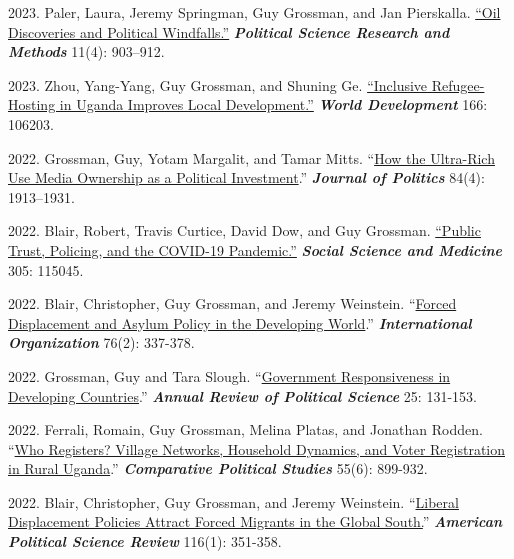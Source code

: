 \documentclass[10pt,a4paper]{article}
\begin{document}
\begin{etaremune}[leftmargin=2.5em, itemsep=8pt, topsep=4pt]
\item \textcolor{secondary}{2023.} Paler, Laura, Jeremy Springman, Guy Grossman, and Jan Pierskalla. \href{https://doi.org/10.1017/psrm.2023.14}{``Oil Discoveries and Political Windfalls.''} \textbf{\textit{Political Science Research and Methods}} 11(4): 903--912.

\item \textcolor{secondary}{2023.} Zhou, Yang-Yang, Guy Grossman, and Shuning Ge. \href{https://authors.elsevier.com/sd/article/S0305750X23000219}{``Inclusive Refugee-Hosting in Uganda Improves Local Development.''} \textbf{\textit{World Development}} 166: 106203.

\item \textcolor{secondary}{2022.} Grossman, Guy, Yotam Margalit, and Tamar Mitts. ``\href{https://bit.ly/3DIZeQA}{How the Ultra-Rich Use Media Ownership as a Political Investment}.'' \textbf{\textit{Journal of Politics}} 84(4): 1913--1931.

\item \textcolor{secondary}{2022.} Blair, Robert, Travis Curtice, David Dow, and Guy Grossman. \href{https://doi.org/10.1016/j.socscimed.2022.115045}{``Public Trust, Policing, and the COVID-19 Pandemic.''} \textbf{\textit{Social Science and Medicine}} 305: 115045.

\item \textcolor{secondary}{2022.} Blair, Christopher, Guy Grossman, and Jeremy Weinstein. ``\href{https://bit.ly/2ZfRc1z}{Forced Displacement and Asylum Policy in the Developing World}.'' \textbf{\textit{International Organization}} 76(2): 337-378.

\item \textcolor{secondary}{2022.} Grossman, Guy and Tara Slough. ``\href{https://www.annualreviews.org/doi/abs/10.1146/annurev-polisci-051120-112501}{Government Responsiveness in Developing Countries}.'' \textbf{\textit{Annual Review of Political Science}} 25: 131-153.

\item \textcolor{secondary}{2022.} Ferrali, Romain, Guy Grossman, Melina Platas, and Jonathan Rodden. ``\href{https://journals.sagepub.com/doi/full/10.1177/00104140211036048}{Who Registers? Village Networks, Household Dynamics, and Voter Registration in Rural Uganda}.'' \textbf{\textit{Comparative Political Studies}} 55(6): 899-932.

\item \textcolor{secondary}{2022.} Blair, Christopher, Guy Grossman, and Jeremy Weinstein. ``\href{https://bit.ly/3BUGLPb}{Liberal Displacement Policies Attract Forced Migrants in the Global South.}'' \textbf{\textit{American Political Science Review}} 116(1): 351-358.


\end{etaremune}
\end{document}
